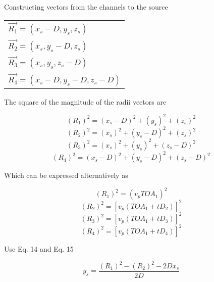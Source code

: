 \documentclass[12pt]{article}
\begin{document}
\noindent Constructing vectors from the channels to the source

\begin{center}
\begin{tabular}{l}
$\overrightarrow{R_1} = (x_s-D,y_s,z_s)$\\
$\overrightarrow{R_2} = (x_s,y_s-D,z_s)$\\
$\overrightarrow{R_3} = (x_s,y_s,z_s-D)$\\
$\overrightarrow{R_4} = (x_s-D,y_s-D,z_s-D)$\\
\end{tabular}
\end{center}

\noindent The square of the magnitude of the radii vectors are

\begin{center}
\begin{equation} \label{eq:14}
(R_1)^2 = (x_s-D)^2 + (y_s)^2 + (z_s)^2
\end{equation}
\begin{equation} \label{eq:15}
(R_2)^2 = (x_s)^2 + (y_s-D)^2 + (z_s)^2
\end{equation}
\begin{equation} \label{eq:16}
(R_3)^2 = (x_s)^2 + (y_s)^2 + (z_s-D)^2
\end{equation}
\begin{equation} \label{eq:17}
(R_4)^2 = (x_s-D)^2 + (y_s-D)^2 + (z_s-D)^2
\end{equation}
\end{center}

\vspace{5 mm}
\noindent Which can be expressed alternatively as

\begin{center}
\begin{equation} \label{eq:18}
(R_1)^2 = (v_p TOA_1)^2
\end{equation}
\begin{equation} \label{eq:19}
(R_2)^2 = [v_p (TOA_1 + tD_2)]^2
\end{equation}
\begin{equation} \label{eq:20}
(R_3)^2 = [v_p (TOA_1 + tD_3)]^2
\end{equation}
\begin{equation} \label{eq:21}
(R_4)^2 = [v_p (TOA_1 + tD_4)]^2
\end{equation}
\end{center}

\pagebreak

\noindent Use Eq. 14 and Eq. 15
\begin{center}
\begin{equation} \label{eq:22}
y_s = \frac{(R_1)^2 - (R_2)^2 - 2Dx_s}{2D}
\end{equation}
\end{center}
\end{document}
